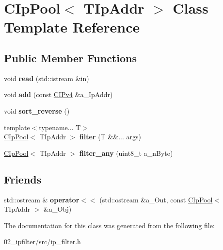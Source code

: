 \hypertarget{classCIpPool}{}\section{C\+Ip\+Pool$<$ T\+Ip\+Addr $>$ Class Template Reference}
\label{classCIpPool}
\subsection*{Public Member Functions}
\begin{DoxyCompactItemize}
\item 
\mbox{\label{classCIpPool_ad3f8868bd7104905fe6826effb8af320}} 
void {\bfseries read} (std\+::istream \&in)
\item 
\mbox{\label{classCIpPool_af46714daa87d772684d4af17ae4928f5}} 
void {\bfseries add} (const \hyperlink{classCIPv4}{C\+I\+Pv4} \&a\+\_\+\+Ip\+Addr)
\item 
\mbox{\label{classCIpPool_aef137044a55355584546fcc41267bed1}} 
void {\bfseries sort\+\_\+reverse} ()
\item 
\mbox{\label{classCIpPool_a43a17bdff6862a5cd9d51ab7714ab0cd}} 
{\footnotesize template$<$typename... T$>$ }\\\hyperlink{classCIpPool}{C\+Ip\+Pool}$<$ T\+Ip\+Addr $>$ {\bfseries filter} (T \&\&... args)
\item 
\mbox{\label{classCIpPool_a1dd4f6418d93aafa7da57ded5b5c546a}} 
\hyperlink{classCIpPool}{C\+Ip\+Pool}$<$ T\+Ip\+Addr $>$ {\bfseries filter\+\_\+any} (uint8\+\_\+t a\+\_\+n\+Byte)
\end{DoxyCompactItemize}
\subsection*{Friends}
\begin{DoxyCompactItemize}
\item 
\mbox{\label{classCIpPool_a70d5c7a3fb66ee62dc9ae008d600270b}} 
std\+::ostream \& {\bfseries operator$<$$<$} (std\+::ostream \&a\+\_\+\+Out, const \hyperlink{classCIpPool}{C\+Ip\+Pool}$<$ T\+Ip\+Addr $>$ \&a\+\_\+\+Obj)
\end{DoxyCompactItemize}


The documentation for this class was generated from the following file\+:\begin{DoxyCompactItemize}
\item 
02\+\_\+ipfilter/src/ip\+\_\+filter.\+h\end{DoxyCompactItemize}
